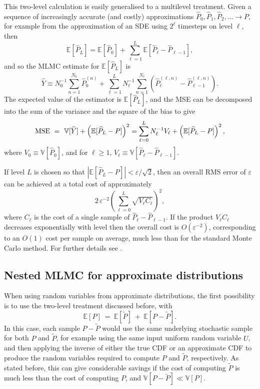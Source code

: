 \documentclass[11pt]{article}
\def \EE {{\mathbb{E}}}
\def \VV {{\mathbb{V}}}
\def \tP {{\widetilde{P}}}
\def \hP {{\widehat{P}}}
\def \hY {{\widehat{Y}}}
\def\eps{{\varepsilon}}
\begin{document}
This two-level calculation is easily generalised to a multilevel treatment.
Given a sequence of increasingly accurate (and costly) approximations 
$\hP_0, \hP_1, \hP_2, \ldots \longrightarrow P$, for example from the
approximation of an SDE using $2^\ell$ timesteps on level $\ell$, then
\[
\EE[ \hP_L ] = \EE[ \hP_0 ] + \sum_{\ell=1}^L \EE[ \hP_\ell {-} \hP_{\ell-1} ],
\]
and so the MLMC estimate for $\EE[\hP_L]$ is
\[
\hY \equiv N_0^{-1}  \sum_{n=1}^{N_0} \hP_0^{(n)} + 
\sum_{\ell=1}^L N_\ell^{-1}  \sum_{n=1}^{N_\ell} (\hP_\ell^{(\ell,n)} - \hP_{\ell-1}^{(\ell,n)}).
\]
The expected value of the estimator is $\EE[\hP_L]$, and the MSE
can be decomposed into the sum of the variance and the square of the bias
to give
\[
  {\rm MSE}\ =\  
  \VV[\hY] + \left( \EE[\hP_L - P] \right)^2
  = \sum_{\ell=0}^L N^{-1}_\ell V_\ell + \left( \EE[\hP_L - P] \right)^2,
\]
where $V_0\equiv\VV[\hP_0]$, and for $\ell\!\geq\!1$, 
$V_\ell \equiv \VV[\hP_\ell {-}\hP_{\ell-1}]$.

If level $L$ is chosen so that $|\EE[\hP_L - P]| \!<\! \eps/\sqrt{2}$, then
an overall RMS error of $\eps$ can be achieved at a total cost of approximately
\[
  2\, \eps^{-2} \left( \sum_{\ell=0}^L \sqrt{V_\ell C_\ell} \right)^2,
\]
where $C_\ell$ is the cost of a single sample of $\hP_\ell {-}\hP_{\ell-1}$.  
If the product $V_\ell C_\ell$ decreases exponentially with level then the overall 
cost is $O(\eps^{-2})$, corresponding to an $O(1)$ cost per sample on average, 
much less than for the standard Monte Carlo method.
For further details see \cite{giles08,giles15}.

\subsection{Nested MLMC for approximate distributions}

\label{sec:nested_MLMC}

When using random variables from approximate distributions, the first possibility is
to use the two-level treatment discussed before, with
\[
\EE[ P ]\ =\ \EE[ \tP ]\ +\ \EE[ P {-} \tP ].
\]
In this case, each sample $P {-} \tP$ would use the same underlying stochastic
sample for both $P$ and $\tP$, for example using the same input uniform random
variable $U$, and then applying the inverse of either the true CDF or an approximate CDF to
produce the random variables required to compute $P$ and $\tP$, respectively.
As stated before, this can give considerable savings if the cost of computing $\tP$
is much less than the cost of computing $P$, and $\VV[P{-}\tP] \ll \VV[P]$.
\end{document}
